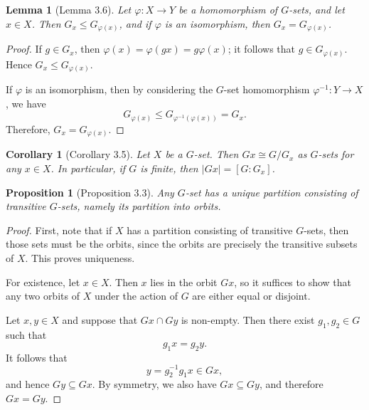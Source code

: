 \documentclass[titlepage]{article}
\theoremstyle{plain}
\newtheorem{lemma}[theorem]{Lemma}
\newtheorem{proposition}[theorem]{Proposition}
\newtheorem{corollary}[theorem]{Corollary}
\theoremstyle{definition}
\theoremstyle{remark}
\theoremstyle{exercise-style}
\numberwithin{equation}{section}
\numberwithin{theorem}{section}
\numberwithin{remark}{section}
\begin{document}
\begin{myboxg}
    \begin{lemma}[Lemma 3.6]
        Let $\varphi : X \to Y$ be a homomorphism of $G$-sets, and let $x \in X$. 
        Then $G_x \leqslant G_{\varphi(x)}$, and if $\varphi$ is an isomorphism, then 
        $G_x = G_{\varphi(x)}$.
    \end{lemma}
\end{myboxg}

\begin{proof}
    If $g \in G_x$, then $\varphi(x) = \varphi(gx) = g\varphi(x)$; it follows that 
    $g \in G_{\varphi(x)}$. Hence $G_x \leqslant G_{\varphi(x)}$.
    
    If $\varphi$ is an isomorphism, then by considering the $G$-set homomorphism 
    $\varphi^{-1} : Y \to X$, we have
    \[
    G_{\varphi(x)} \leqslant G_{\varphi^{-1}(\varphi(x))} = G_x.
    \]
    Therefore, $G_x = G_{\varphi(x)}$.
\end{proof}

\begin{myboxg}
    \begin{corollary}[Corollary 3.5]
        Let $X$ be a $G$-set. Then $Gx \cong G / G_x$ as $G$-sets for any $x \in X$. 
        In particular, if $G$ is finite, then $|Gx| = [G : G_x]$.
    \end{corollary}
\end{myboxg}

\begin{myboxg}
    \begin{proposition}[Proposition 3.3]
        Any $G$-set has a unique partition consisting of transitive $G$-sets, 
        namely its partition into orbits.
    \end{proposition}
\end{myboxg}

\begin{proof}
    First, note that if $X$ has a partition consisting of transitive $G$-sets, 
    then those sets must be the orbits, since the orbits are precisely the 
    transitive subsets of $X$. This proves uniqueness.
    
    For existence, let $x \in X$. Then $x$ lies in the orbit $Gx$, so it suffices 
    to show that any two orbits of $X$ under the action of $G$ are either equal 
    or disjoint.
    
    Let $x, y \in X$ and suppose that $Gx \cap Gy$ is non-empty. Then there exist 
    $g_1, g_2 \in G$ such that
    \[
    g_1 x = g_2 y.
    \]
    It follows that
    \[
    y = g_2^{-1} g_1 x \in Gx,
    \]
    and hence $Gy \subseteq Gx$. By symmetry, we also have $Gx \subseteq Gy$, 
    and therefore $Gx = Gy$.
\end{proof}
\end{document}
